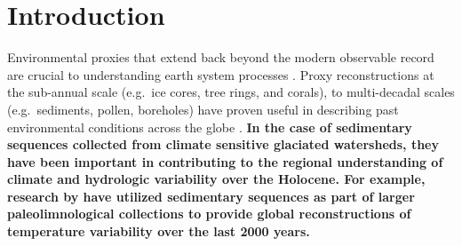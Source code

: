 \documentclass[Royal,times,doublespace,sageh]{sagej}
\begin{document}

\maketitle

\hypertarget{introduction}{%
\section{Introduction}\label{introduction}}

Environmental proxies that extend back beyond the modern observable
record are crucial to understanding earth system processes
\citep{Turney2019, Huber2012, Nelson2016}. Proxy reconstructions at the
sub-annual scale (e.g.~ice cores, tree rings, and corals), to
multi-decadal scales (e.g.~sediments, pollen, boreholes) have proven
useful in describing past environmental conditions across the globe
\citep{Masson2013}. \textbf{In the case of sedimentary sequences
collected from climate sensitive glaciated watersheds, they have been
important in contributing to the regional understanding of climate and
hydrologic variability over the Holocene. For example, research by
\citet{Neukom2019} have utilized sedimentary sequences as part of larger
paleolimnological collections to provide global reconstructions of
temperature variability over the last 2000 years. }
\end{document}
